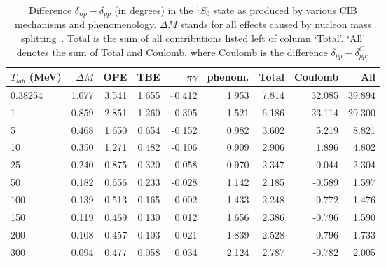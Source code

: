 \begin{table}
\caption{
Difference 
$\delta_{np} - \delta_{pp}$ 
(in degrees) in the $^1S_0$ state
as produced by various CIB mechanisms and phenomenology.
$\Delta M$ stands for all 
effects caused by nucleon mass splitting~\protect\cite{foot3}.
Total is the sum of all contributions listed left of column `Total'.
`All' denotes the sum of Total and Coulomb, where Coulomb is the difference
$\delta_{pp} - \delta_{pp}^C$. 
}
\begin{tabular}{lrrrrrrrr}
 $T_{lab}$ (MeV) 
 & $\Delta M$
 & OPE
 & TBE 
 & $\pi\gamma$
 & phenom.
 & Total 
 & Coulomb
 & All
\\
 \hline 
\hline                                                                          
0.38254& 1.077 & 3.541 & 1.655 & --0.412 & 1.953 & 7.814 &32.085 &39.894 \\
    1 & 0.859 & 2.851 & 1.260 &-0.305 & 1.521 & 6.186 &23.114 &29.300 \\
    5 & 0.468 & 1.650 & 0.654 &-0.152 & 0.982 & 3.602 & 5.219 & 8.821 \\
   10 & 0.350 & 1.271 & 0.482 &-0.106 & 0.909 & 2.906 & 1.896 & 4.802 \\
   25 & 0.240 & 0.875 & 0.320 &-0.058 & 0.970 & 2.347 &-0.044 & 2.304 \\
   50 & 0.182 & 0.656 & 0.233 &-0.028 & 1.142 & 2.185 &-0.589 & 1.597 \\
  100 & 0.139 & 0.513 & 0.165 &-0.002 & 1.433 & 2.248 &-0.772 & 1.476 \\
  150 & 0.119 & 0.469 & 0.130 & 0.012 & 1.656 & 2.386 &-0.796 & 1.590 \\
  200 & 0.108 & 0.457 & 0.103 & 0.021 & 1.839 & 2.528 &-0.796 & 1.733 \\
  300 & 0.094 & 0.477 & 0.058 & 0.034 & 2.124 & 2.787 &-0.782 & 2.005 \\
\end{tabular}
\label{tab_CIB1S0}
\end{table}


\pagebreak


